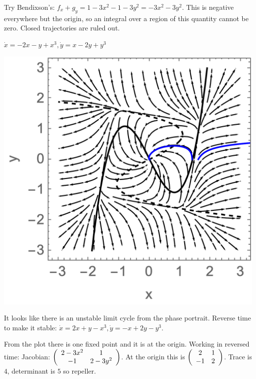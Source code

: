 \documentclass[12pt,letterpaper,answers]{exam}
\begin{document}
\begin{questions}
\begin{parts}
\begin{solution}
Try Bendixson's: $f_x + g_y = 1 - 3x^2 -1-3y^2 = -3x^2 - 3y^2$.  This is negative everywhere but the origin, so an integral over a region of this quantity cannot be zero.  Closed trajectories are ruled out.


    
    \end{solution}
    \item $\dot x = -2x-y + x^3, \dot y = x - 2 y + y^3$
    \begin{solution}

\includegraphics{img/PS07-S23-2.png}
    
It looks like there is an unstable limit cycle from the phase portrait.  Reverse time to make it stable: $\dot x = 2x+y - x^3, \dot y = -x + 2 y - y^3$.

From the plot there is one fixed point and it is at the origin.  Working in reversed time: Jacobian: $\left(\begin{array}{c c} 2 - 3x^2 & 1 \\ -1 & 2- 3y^2 \end{array}\right)$.  At the origin this is $\left(\begin{array}{c c} 2 & 1 \\ -1 & 2 \end{array}\right)$.  Trace is $4$, determinant is $5$ so repeller.


\end{solution}
\end{parts}
\end{questions}
\end{document}

